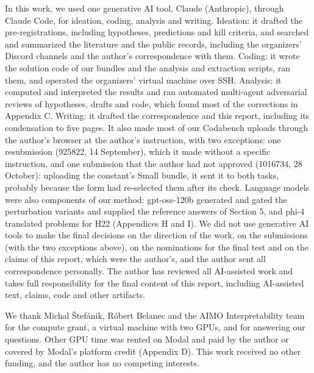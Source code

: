 \documentclass{article}
\begin{document}
In this work, we used one generative AI tool, Claude (Anthropic), through Claude Code, for ideation, coding, analysis and writing. Ideation: it drafted the pre-registrations, including hypotheses, predictions and kill criteria, and searched and summarized the literature and the public records, including the organizers' Discord channels and the author's correspondence with them. Coding: it wrote the solution code of our bundles and the analysis and extraction scripts, ran them, and operated the organizers' virtual machine over SSH. Analysis: it computed and interpreted the results and ran automated multi-agent adversarial reviews of hypotheses, drafts and code, which found most of the corrections in Appendix C. Writing: it drafted the correspondence and this report, including its condensation to five pages. It also made most of our Codabench uploads through the author's browser at the author's instruction, with two exceptions: one resubmission (925822, 14 September), which it made without a specific instruction, and one submission that the author had not approved (1016734, 28 October): uploading the constant's Small bundle, it sent it to both tasks, probably because the form had re-selected them after its check. Language models were also components of our method: gpt-oss-120b generated and gated the perturbation variants and supplied the reference answers of Section 5, and phi-4 translated problems for H22 (Appendices H and I). We did not use generative AI tools to make the final decisions on the direction of the work, on the submissions (with the two exceptions above), on the nominations for the final test and on the claims of this report, which were the author's, and the author sent all correspondence personally. The author has reviewed all AI-assisted work and takes full responsibility for the final content of this report, including AI-assisted text, claims, code and other artifacts.

\begin{ack}
We thank Michal Štefánik, Róbert Belanec and the AIMO Interpretability team for the compute grant, a virtual machine with two GPUs, and for answering our questions. Other GPU time was rented on Modal and paid by the author or covered by Modal's platform credit (Appendix D). This work received no other funding, and the author has no competing interests.
\end{ack}
\end{document}
